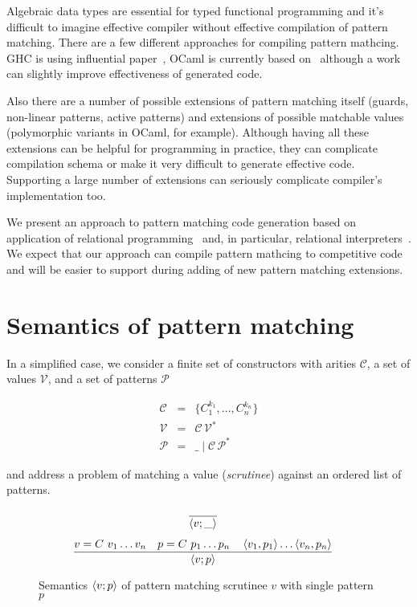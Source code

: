 Algebraic data types are essential for typed functional programming and it's difficult to imagine effective compiler without effective compilation of pattern matching. 
There are a few different approaches for compiling pattern mathcing. GHC is using influential paper~\cite{Jones1987}, OCaml is currently based on~\cite{maranget2001} although a work~\cite{maranget2008} can slightly improve effectiveness of generated code. 

Also there are a number of possible extensions of pattern matching itself (guards, non-linear patterns, active patterns) and extensions of possible matchable values (polymorphic variants in OCaml, for example). Although having all these extensions can be helpful for programming in practice, they can complicate compilation schema or make it very difficult to generate effective code. Supporting a large number  of extensions can seriously complicate compiler's implementation too.

We present an approach to pattern matching code generation based on application of relational programming~\cite{TRS,WillThesis} and, in
 particular, relational interpreters~\cite{unified}. We expect that our approach can compile pattern mathcing to competitive code and will be easier to support during adding of new pattern matching extensions.
 
\section{Semantics of pattern matching}
 In a simplified case, we consider a finite set of constructors with arities $\mathcal{C}$, a set of values $\mathcal{V}$,
 and a set of patterns $\mathcal{P}$
 
 \[
  \begin{array}{rcll}
     \mathcal{C} & = & \{ C_1^{k_1}, \dots, C_n^{k_n} \}\\
     \mathcal{V} & = & \mathcal{C}\,\mathcal{V}^*\\  
     \mathcal{P} & = & \_ \mid \mathcal{C}\,\mathcal{P}^*
  \end{array}
 \]
 
 and address a problem of matching a value (\emph{scrutinee}) against an ordered list of patterns.

\begin{figure}
   \[
   \begin{array}{cr}
     \dfrac{}{\left<{v; \_}\right>} & 
      \\[5mm]
     \dfrac{v = C\ v_1\dots v_n\quad p = C\ p_1\dots p_n\quad  \left<{v_1,p_1}\right>\dots \left<{v_n,p_n}\right>}{\left<{v;p}\right>} & 
   \end{array}
   \]
   \caption{Semantics $\left<{v;p}\right>$ of pattern matching scrutinee $v$ with single pattern $p$}
  \label{fig:match1pat}
\end{figure}
 
